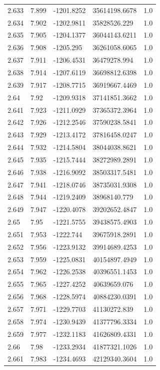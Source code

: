 \begin{tabular}{lllll}
2.633 & 7.899 & -1201.8252 & 35614198.6678 & 1.0 \\
2.634 & 7.902 & -1202.9811 & 35828526.229 & 1.0 \\
2.635 & 7.905 & -1204.1377 & 36044143.6211 & 1.0 \\
2.636 & 7.908 & -1205.295 & 36261058.6065 & 1.0 \\
2.637 & 7.911 & -1206.4531 & 36479278.994 & 1.0 \\
2.638 & 7.914 & -1207.6119 & 36698812.6398 & 1.0 \\
2.639 & 7.917 & -1208.7715 & 36919667.4469 & 1.0 \\
2.64 & 7.92 & -1209.9318 & 37141851.3662 & 1.0 \\
2.641 & 7.923 & -1211.0929 & 37365372.3964 & 1.0 \\
2.642 & 7.926 & -1212.2546 & 37590238.5841 & 1.0 \\
2.643 & 7.929 & -1213.4172 & 37816458.0247 & 1.0 \\
2.644 & 7.932 & -1214.5804 & 38044038.8621 & 1.0 \\
2.645 & 7.935 & -1215.7444 & 38272989.2891 & 1.0 \\
2.646 & 7.938 & -1216.9092 & 38503317.5481 & 1.0 \\
2.647 & 7.941 & -1218.0746 & 38735031.9308 & 1.0 \\
2.648 & 7.944 & -1219.2409 & 38968140.779 & 1.0 \\
2.649 & 7.947 & -1220.4078 & 39202652.4847 & 1.0 \\
2.65 & 7.95 & -1221.5755 & 39438575.4903 & 1.0 \\
2.651 & 7.953 & -1222.744 & 39675918.2891 & 1.0 \\
2.652 & 7.956 & -1223.9132 & 39914689.4253 & 1.0 \\
2.653 & 7.959 & -1225.0831 & 40154897.4949 & 1.0 \\
2.654 & 7.962 & -1226.2538 & 40396551.1453 & 1.0 \\
2.655 & 7.965 & -1227.4252 & 40639659.076 & 1.0 \\
2.656 & 7.968 & -1228.5974 & 40884230.0391 & 1.0 \\
2.657 & 7.971 & -1229.7703 & 41130272.839 & 1.0 \\
2.658 & 7.974 & -1230.9439 & 41377796.3334 & 1.0 \\
2.659 & 7.977 & -1232.1183 & 41626809.4331 & 1.0 \\
2.66 & 7.98 & -1233.2934 & 41877321.1026 & 1.0 \\
2.661 & 7.983 & -1234.4693 & 42129340.3604 & 1.0 \\

\end{tabular}
